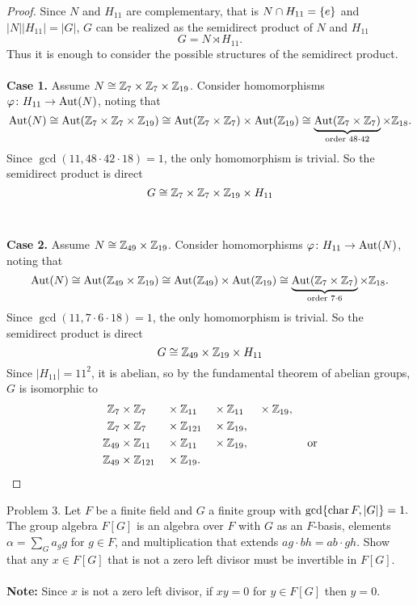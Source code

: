 \documentclass{article}
\begin{document}
\begin{proof}
  Since $N$ and $H_{11}$ are complementary,
  that is $N \cap H_{11} = \{e\}$ and $|N||H_{11}| = |G|$,
  $G$ can be realized as the semidirect product of $N$ and $H_{11}$ \[
    G = N \rtimes H_{11}.
  \]
  Thus it is enough to consider the possible structures of the semidirect
  product.
  \\~\\
  \textbf{Case 1.} Assume $N \cong \mathbb Z_7 \times \mathbb Z_7 \times \mathbb Z_{19}$.
  Consider homomorphisms ${\varphi \colon H_{11} \rightarrow \operatorname{Aut}(N)}$, noting that \[
    \operatorname{Aut}(N)
    \cong \operatorname{Aut}(\mathbb Z_7 \times \mathbb Z_7 \times \mathbb Z_{19})
    \cong \operatorname{Aut}(\mathbb Z_7 \times \mathbb Z_7) \times \operatorname{Aut}(\mathbb Z_{19})
    \cong \underbrace{\operatorname{Aut}(\mathbb Z_7 \times \mathbb Z_7)}_{\text{order } 48 \cdot 42} \times \mathbb Z_{18}.
  \]
  Since $\gcd(11, 48\cdot42\cdot18) = 1$, the only homomorphism is trivial.
  So the semidirect product is direct \[
    G \cong \mathbb Z_{7} \times \mathbb Z_7 \times \mathbb Z_{19} \times H_{11}
  \]
  \\~\\
  \textbf{Case 2.} Assume $N \cong \mathbb Z_{49} \times \mathbb Z_{19}$.
  Consider homomorphisms ${\varphi \colon H_{11} \rightarrow \operatorname{Aut}(N)}$, noting that \[
    \operatorname{Aut}(N)
    \cong \operatorname{Aut}(\mathbb Z_{49} \times \mathbb Z_{19})
    \cong \operatorname{Aut}(\mathbb Z_{49}) \times \operatorname{Aut}(\mathbb Z_{19})
    \cong \underbrace{\operatorname{Aut}(\mathbb Z_7 \times \mathbb Z_7)}_{\text{order } 7 \cdot 6} \times \mathbb Z_{18}.
  \]
  Since $\gcd(11, 7\cdot6\cdot18) = 1$, the only homomorphism is trivial.
  So the semidirect product is direct \[
    G \cong \mathbb Z_{49} \times \mathbb Z_{19} \times H_{11}
  \]
  Since $|H_{11}| = 11^2$, it is abelian, so by the fundamental theorem
  of abelian groups, $G$ is isomorphic to \begin{alignat*}{5}
    \mathbb Z_{7} &\times \mathbb Z_{7} &&\times \mathbb Z_{11} &&\times \mathbb Z_{11} &&\times \mathbb Z_{19},&& \\
    \mathbb Z_{7} &\times \mathbb Z_{7} &&\times \mathbb Z_{121} &&\times \mathbb Z_{19}, && &&\\
    \mathbb Z_{49} &\times \mathbb Z_{11} &&\times \mathbb Z_{11} &&\times \mathbb Z_{19},&& && \text{ or}\\
    \mathbb Z_{49} &\times \mathbb Z_{121} &&\times \mathbb Z_{19}.  && && &&
  \end{alignat*}
\end{proof}
\pagebreak

\begin{subsection}{Problem 3.}
  Let $F$ be a finite field and $G$ a finite group with
  $\gcd\{\operatorname{char} F, |G|\} = 1.$ The group algebra $F[G]$ is an
  algebra over $F$ with $G$ as an $F$-basis, elements $\alpha = \sum_G a_gg$ for
  $g \in F$, and multiplication that extends $ag \cdot bh = ab \cdot gh$.
  Show that any $x \in F[G]$ that is not a zero left divisor must be invertible
  in $F[G]$.
  \\~\\
  \textbf{Note:} Since $x$ is not a zero left divisor, if $xy = 0$ for
  $y \in F[G]$ then $y=0$.
\end{subsection}
\end{document}
